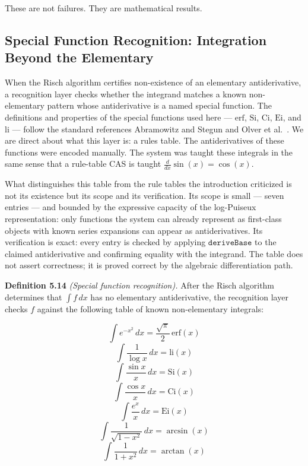 \documentclass[12pt]{article}
\begin{document}
These are not failures. They are mathematical results.




\subsection{Special Function Recognition: Integration Beyond the
Elementary}\label{special-function-recognition-integration-beyond-the-elementary}

When the Risch algorithm certifies non-existence of an elementary
antiderivative, a recognition layer checks whether the integrand matches
a known non-elementary pattern whose antiderivative is a named special
function. The definitions and properties of the special functions used
here --- $\mathrm{erf}$, $\mathrm{Si}$, $\mathrm{Ci}$, $\mathrm{Ei}$,
and $\mathrm{li}$ --- follow the standard references Abramowitz and
Stegun \cite{abramowitz1964} and Olver et al.\ \cite{olver2010}. We are
direct about what this layer is: a rules table. The antiderivatives of
these functions were encoded manually. The system was taught these
integrals in the same sense that a rule-table CAS is taught
\(\frac{d}{dx}\sin(x) = \cos(x)\).

What distinguishes this table from the rule tables the introduction
criticized is not its existence but its scope and its verification. Its
scope is small --- seven entries --- and bounded by the expressive
capacity of the log-Puiseux representation: only functions the system
can already represent as first-class objects with known series
expansions can appear as antiderivatives. Its verification is exact:
every entry is checked by applying \(\mathtt{deriveBase}\) to the
claimed antiderivative and confirming equality with the integrand. The
table does not assert correctness; it is proved correct by the algebraic
differentiation path.

\textbf{Definition 5.14} \emph{(Special function recognition).} After
the Risch algorithm determines that \(\int f\,dx\) has no elementary
antiderivative, the recognition layer checks \(f\) against the following
table of known non-elementary integrals:

\[\int e^{-x^2}\,dx = \frac{\sqrt{\pi}}{2}\,\mathrm{erf}(x)\]
\[\int \frac{1}{\log x}\,dx = \mathrm{li}(x)\]
\[\int \frac{\sin x}{x}\,dx = \mathrm{Si}(x)\]
\[\int \frac{\cos x}{x}\,dx = \mathrm{Ci}(x)\]
\[\int \frac{e^x}{x}\,dx = \mathrm{Ei}(x)\]
\[\int \frac{1}{\sqrt{1-x^2}}\,dx = \arcsin(x)\]
\[\int \frac{1}{1+x^2}\,dx = \arctan(x)\]
\end{document}
